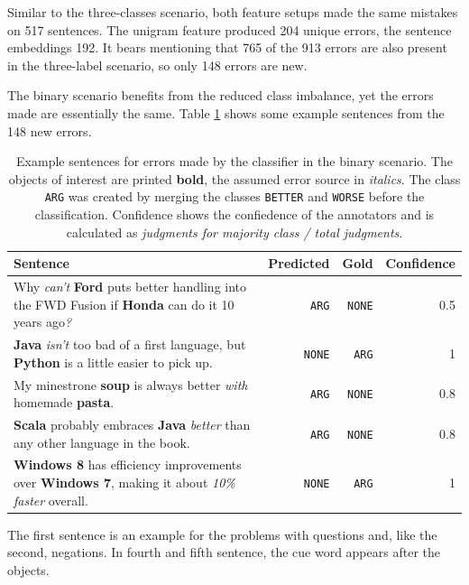 Similar to the three-classes scenario, both feature setups made the same mistakes on 517 sentences. The unigram feature produced 204 unique errors, the sentence embeddings 192. It bears mentioning that 765 of the 913 errors are also present in the three-label scenario, so only 148 errors are new. 


The binary scenario benefits from the reduced class imbalance, yet the errors made are essentially the same. Table \ref{tbl:2_mistakes} shows some example sentences from the 148 new errors.

\begin{table}[h]
\caption{Example sentences for errors made by the classifier in the binary scenario. The objects of interest are printed \textbf{bold}, the assumed error source in \emph{italics}. The class \texttt{ARG} was created by merging the classes \texttt{BETTER} and \texttt{WORSE} before the classification. Confidence shows the confiedence of the annotators and is calculated as \emph{judgments for majority class / total judgments}.}
\label{tbl:2_mistakes}
\begin{tabularx}{\linewidth}{Xrrr}
\toprule
 Sentence & Predicted & Gold & Confidence\\ \midrule
 Why \emph{can't} \textbf{Ford} puts better handling into the FWD Fusion if \textbf{Honda} can do it 10 years ago\emph{?} & \texttt{ARG} & \texttt{NONE} & 0.5\\
 
 \textbf{Java} \emph{isn't} too bad of a first language, but \textbf{Python} is a little easier to pick up. & \texttt{NONE} & \texttt{ARG} & 1 \\
 My minestrone \textbf{soup} is always better \emph{with} homemade \textbf{pasta}. & \texttt{ARG} & \texttt{NONE} & 0.8\\
 
 \textbf{Scala} probably embraces \textbf{Java} \emph{better} than any other language in the book. & \texttt{ARG} & \texttt{NONE} & 0.8 \\
 
 \textbf{Windows 8} has efficiency improvements over \textbf{Windows 7}, making it about \emph{10\% faster} overall. & \texttt{NONE} & \texttt{ARG} & 1 \\
\bottomrule
\end{tabularx}

\end{table}

The first sentence is an example for the problems with questions and, like the second, negations. In fourth and fifth sentence, the cue word appears after the objects.
\FloatBarrier
